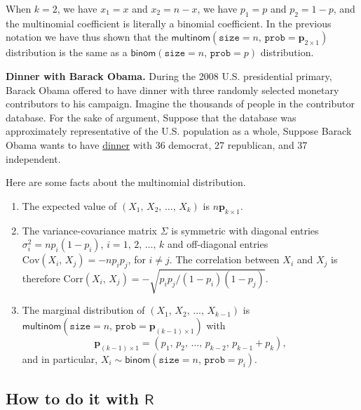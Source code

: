 \documentclass[captions=tableheading]{scrbook}
\begin{document}
When \(k=2\), we have \(x_{1}=x\) and \(x_{2}=n-x\), we have \(p_{1}=p\) and \(p_{2}=1-p\), and the multinomial coefficient is literally a binomial coefficient. In the previous notation we have thus shown that the \(\mathsf{multinom}(\mathtt{size}=n,\,\mathtt{prob}=\mathbf{p}_{2\times1})\) distribution is the same as a \(\mathsf{binom}(\mathtt{size}=n,\,\mathtt{prob}=p)\) distribution.

\begin{example}
\textbf{Dinner with Barack Obama.} During the 2008 U.S. presidential primary, Barack Obama offered to have dinner with three randomly selected monetary contributors to his campaign. Imagine the thousands of people in the contributor database. For the sake of argument, Suppose that the database was approximately representative of the U.S. population as a whole, Suppose Barack Obama wants to have \href{http://pewresearch.org/pubs/773/fewer-voters-identify-as-republicans}{dinner} with 36 democrat, 27 republican, and 37 independent.
\end{example}

\begin{rem}
Here are some facts about the multinomial distribution.
\begin{enumerate}
\item The expected value of \((X_{1},\, X_{2},\,\ldots,\, X_{k})\) is \(n\mathbf{p}_{k\times1}\).
\item The variance-covariance matrix \(\Sigma\) is symmetric with diagonal entries \(\sigma_{i}^{2}=np_{i}(1-p_{i})\), \(i=1,\,2,\,\ldots,\, k\) and off-diagonal entries \(\mbox{Cov}(X_{i},\, X_{j})=-np_{i}p_{j}\), for \(i\neq j\). The correlation between \(X_{i}\) and \(X_{j}\) is therefore \(\mbox{Corr}(X_{i},\, X_{j})=-\sqrt{p_{i}p_{j}/(1-p_{i})(1-p_{j})}\).
\item The marginal distribution of \((X_{1},\, X_{2},\,\ldots,\, X_{k-1})\) is \(\mathsf{multinom}(\mathtt{size}=n,\,\mathtt{prob}=\mathbf{p}_{(k-1)\times1})\) with
   \begin{equation}
   \mathbf{p}_{(k-1)\times1}=\left(p_{1},\, p_{2},\,\ldots,\, p_{k-2},\, p_{k-1}+p_{k}\right),
   \end{equation}
   and in particular, \(X_{i}\sim\mathsf{binom}(\mathtt{size}=n,\,\mathtt{prob}=p_{i})\).
\end{enumerate}

\end{rem}
\subsection{How to do it with \(\mathsf{R}\)}
\label{sec-7-9-1}
\end{document}
